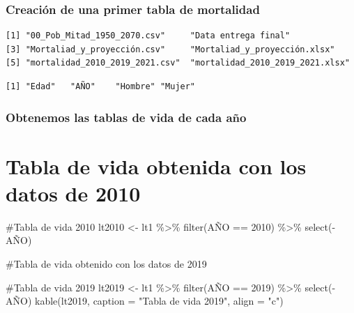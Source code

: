 \documentclass[
  letterpaper,
  DIV=11,
  numbers=noendperiod]{scrartcl}
\newenvironment{Shaded}{\begin{snugshade}}{\end{snugshade}}
\newcommand{\AttributeTok}[1]{\textcolor[rgb]{0.40,0.45,0.13}{#1}}
\newcommand{\CommentTok}[1]{\textcolor[rgb]{0.37,0.37,0.37}{#1}}
\newcommand{\DecValTok}[1]{\textcolor[rgb]{0.68,0.00,0.00}{#1}}
\newcommand{\FunctionTok}[1]{\textcolor[rgb]{0.28,0.35,0.67}{#1}}
\newcommand{\NormalTok}[1]{\textcolor[rgb]{0.00,0.23,0.31}{#1}}
\newcommand{\OtherTok}[1]{\textcolor[rgb]{0.00,0.23,0.31}{#1}}
\newcommand{\SpecialCharTok}[1]{\textcolor[rgb]{0.37,0.37,0.37}{#1}}
\newcommand{\StringTok}[1]{\textcolor[rgb]{0.13,0.47,0.30}{#1}}
\begin{document}
\subsubsection{Creación de una primer tabla de
mortalidad}\label{creaciuxf3n-de-una-primer-tabla-de-mortalidad}

\begin{verbatim}
[1] "00_Pob_Mitad_1950_2070.csv"     "Data entrega final"            
[3] "Mortaliad_y_proyección.csv"     "Mortaliad_y_proyección.xlsx"   
[5] "mortalidad_2010_2019_2021.csv"  "mortalidad_2010_2019_2021.xlsx"
\end{verbatim}

\begin{verbatim}
[1] "Edad"   "AÑO"    "Hombre" "Mujer" 
\end{verbatim}

\subsubsection{Obtenemos las tablas de vida de cada
año}\label{obtenemos-las-tablas-de-vida-de-cada-auxf1o}

\section{Tabla de vida obtenida con los datos de
2010}\label{tabla-de-vida-obtenida-con-los-datos-de-2010}

\begin{Shaded}
\begin{Highlighting}[]
\CommentTok{\#Tabla de vida 2010}
\NormalTok{lt2010 }\OtherTok{\textless{}{-}}\NormalTok{ lt1 }\SpecialCharTok{\%\textgreater{}\%}
  \FunctionTok{filter}\NormalTok{(AÑO }\SpecialCharTok{==} \DecValTok{2010}\NormalTok{) }\SpecialCharTok{\%\textgreater{}\%}
    \FunctionTok{select}\NormalTok{(}\SpecialCharTok{{-}}\NormalTok{AÑO)}
\end{Highlighting}
\end{Shaded}

\#Tabla de vida obtenido con los datos de 2019

\begin{Shaded}
\begin{Highlighting}[]
\CommentTok{\#Tabla de vida 2019}
\NormalTok{lt2019 }\OtherTok{\textless{}{-}}\NormalTok{ lt1 }\SpecialCharTok{\%\textgreater{}\%}
  \FunctionTok{filter}\NormalTok{(AÑO }\SpecialCharTok{==} \DecValTok{2019}\NormalTok{) }\SpecialCharTok{\%\textgreater{}\%}
    \FunctionTok{select}\NormalTok{(}\SpecialCharTok{{-}}\NormalTok{AÑO)}
\FunctionTok{kable}\NormalTok{(lt2019, }
      \AttributeTok{caption =} \StringTok{"Tabla de vida 2019"}\NormalTok{, }
      \AttributeTok{align =} \StringTok{"c"}\NormalTok{)}
\end{Highlighting}
\end{Shaded}
\end{document}
